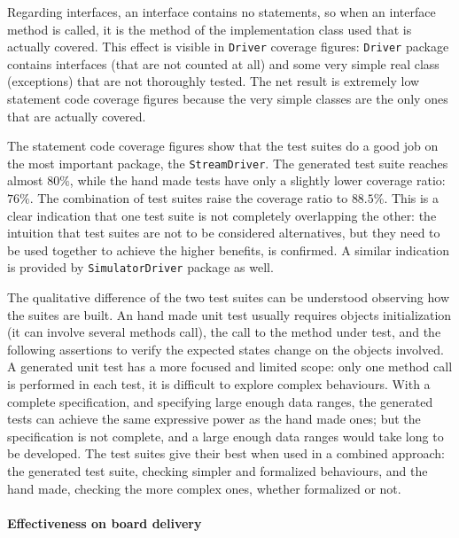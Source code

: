 \documentclass[english]{lni}
\newcommand{\lil}[1]{\texttt{\lstinline|#1|}}
\begin{document}
Regarding interfaces, an interface contains no statements, so when an interface method is called, it is the method of the implementation class used that is actually covered.
This effect is visible in \lil{Driver} coverage figures: \lil{Driver} package contains interfaces (that are not counted at all) and some very simple real class (exceptions) that are not thoroughly tested. 
The net result is extremely low statement code coverage figures because the very simple classes are the only ones that are actually covered. 

The statement code coverage figures show that the test suites do a good job on the most important package, the \lil{StreamDriver}. 
The generated test suite reaches almost $ 80 \% $, while the hand made tests have only a slightly lower coverage ratio: $ 76 \% $. 
The combination of test suites raise the coverage ratio to $ 88.5 \% $. 
This is a clear indication that one test suite is not completely overlapping the other: the intuition that test suites are not to be considered alternatives, but they need to be used together to achieve the higher benefits, is confirmed.
A similar indication is provided by \lil{SimulatorDriver} package as well.

The qualitative difference of the two test suites can be understood observing how the suites are built. 
An hand made unit test usually requires objects initialization (it can involve several methods call), the call to the method under test, and the following assertions to verify the expected states change on the objects involved. 
A generated unit test has a more focused and limited scope: only one method call is performed in each test, it is difficult to explore complex behaviours. 
With a complete specification, and specifying large enough data ranges, the generated tests can achieve the same expressive power as the hand made ones; but the specification is not complete, and a large enough data ranges would take long to be developed.
The test suites give their best when used in a combined approach: the generated test suite, checking simpler and formalized behaviours, and the hand made, checking the more complex ones, whether formalized or not.  



\paragraph*{Effectiveness on board delivery}
\end{document}
